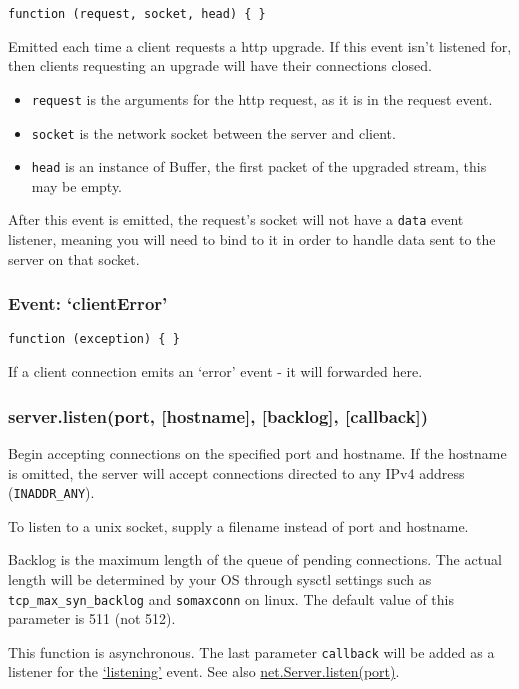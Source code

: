 \texttt{function (request, socket, head) \{ \}}

Emitted each time a client requests a http upgrade. If this event isn't
listened for, then clients requesting an upgrade will have their
connections closed.

\begin{itemize}
\item
  \texttt{request} is the arguments for the http request, as it is in
  the request event.
\item
  \texttt{socket} is the network socket between the server and client.
\item
  \texttt{head} is an instance of Buffer, the first packet of the
  upgraded stream, this may be empty.
\end{itemize}

After this event is emitted, the request's socket will not have a
\texttt{data} event listener, meaning you will need to bind to it in
order to handle data sent to the server on that socket.

\subsubsection{Event: `clientError'}

\texttt{function (exception) \{ \}}

If a client connection emits an `error' event - it will forwarded here.

\subsubsection{server.listen(port, {[}hostname{]}, {[}backlog{]},
{[}callback{]})}

Begin accepting connections on the specified port and hostname. If the
hostname is omitted, the server will accept connections directed to any
IPv4 address (\texttt{INADDR\_ANY}).

To listen to a unix socket, supply a filename instead of port and
hostname.

Backlog is the maximum length of the queue of pending connections. The
actual length will be determined by your OS through sysctl settings such
as \texttt{tcp\_max\_syn\_backlog} and \texttt{somaxconn} on linux. The
default value of this parameter is 511 (not 512).

This function is asynchronous. The last parameter \texttt{callback} will
be added as a listener for the
\href{net.html\#net\_event\_listening}{`listening'} event. See also
\href{net.html\#net\_server\_listen\_port\_host\_backlog\_listeninglistener}{net.Server.listen(port)}.

